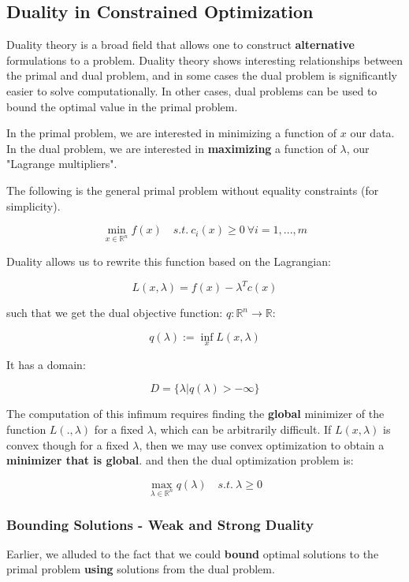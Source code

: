 \documentclass[class=article, crop=false]{standalone}
\theoremstyle{definition}
\theoremstyle{remark}
\theoremstyle{lemma}
\theoremstyle{theorem}
\theoremstyle{corollary}
\theoremstyle{property}
\begin{document}
	\subsection{Duality in Constrained Optimization}
		Duality theory is a broad field that allows one to construct \textbf{alternative} formulations to a problem. Duality theory shows interesting relationships between the primal and dual problem, and in some cases the dual problem is significantly easier to solve computationally. In other cases, dual problems can be used to bound the optimal value in the primal problem. 

		In the primal problem, we are interested in minimizing a function of $x$ our data. In the dual problem, we are interested in \textbf{maximizing} a function of $\lambda$, our "Lagrange multipliers".

		The following is the general primal problem without equality constraints (for simplicity).

			$$\min_{x \in \mathbb{R}^n} f(x) \quad s.t.\ c_i(x) \ge 0\ \forall i = 1,...,m$$

		Duality allows us to rewrite this function based on the Lagrangian:

			$$L(x, \lambda) = f(x) - \lambda^T c(x)$$

		such that we get the dual objective function: $q: \mathbb{R}^n \rightarrow \mathbb{R}$:

			$$q(\lambda) := \inf_{x} L(x, \lambda)$$

		It has a domain:

			$$D = \{ \lambda | q(\lambda) > - \infty \}$$

		The computation of this infimum requires finding the \textbf{global} minimizer of the function $L(., \lambda)$ for a fixed $\lambda$, which can be arbitrarily difficult. If $L(x, \lambda)$ is convex though for a fixed $\lambda$, then we may use convex optimization to obtain a \textbf{minimizer that is global}. and then the dual optimization problem is:

			$$\max_{\lambda \in \mathbb{R}^n} q(\lambda) \quad s.t.\ \lambda \ge 0$$

		\subsubsection{Bounding Solutions - Weak and Strong Duality}

			Earlier, we alluded to the fact that we could \textbf{bound} optimal solutions to the primal problem \textbf{using} solutions from the dual problem.
\end{document}
